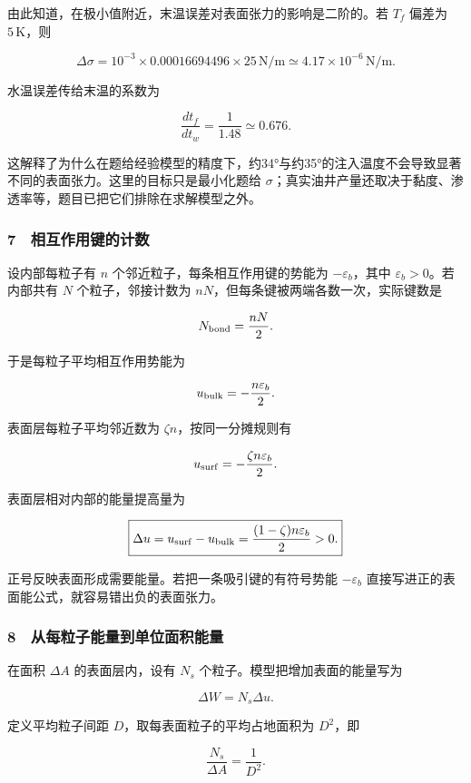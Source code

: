\documentclass[12pt,a4paper,fontset=fandol]{ctexart}
\begin{document}
由此知道，在极小值附近，末温误差对表面张力的影响是二阶的。若 \(T_f\)
偏差为 \(5\,\mathrm K\)，则

\[\Delta\sigma
=10^{-3}\times0.00016694496\times25\,\mathrm{N/m}
\simeq4.17\times10^{-6}\,\mathrm{N/m}.\]

水温误差传给末温的系数为

\[\frac{dt_f}{dt_w}=\frac1{1.48}\simeq0.676.\]

这解释了为什么在题给经验模型的精度下，约34°与约35°的注入温度不会导致显著不同的表面张力。这里的目标只是最小化题给
\(\sigma\)；真实油井产量还取决于黏度、渗透率等，题目已把它们排除在求解模型之外。

\subsubsection{7　相互作用键的计数}\label{ux76f8ux4e92ux4f5cux7528ux952eux7684ux8ba1ux6570}

设内部每粒子有 \(n\) 个邻近粒子，每条相互作用键的势能为
\(-\varepsilon_b\)，其中 \(\varepsilon_b>0\)。若内部共有 \(N\)
个粒子，邻接计数为 \(nN\)，但每条键被两端各数一次，实际键数是

\[N_{\rm bond}=\frac{nN}{2}.\]

于是每粒子平均相互作用势能为

\[u_{\rm bulk}=-\frac{n\varepsilon_b}{2}.\]

表面层每粒子平均邻近数为 \(\zeta n\)，按同一分摊规则有

\[u_{\rm surf}=-\frac{\zeta n\varepsilon_b}{2}.\]

表面层相对内部的能量提高量为

\[\boxed{\Delta u=u_{\rm surf}-u_{\rm bulk}
=\frac{(1-\zeta)n\varepsilon_b}{2}>0.}\]

正号反映表面形成需要能量。若把一条吸引键的有符号势能 \(-\varepsilon_b\)
直接写进正的表面能公式，就容易错出负的表面张力。

\subsubsection{8　从每粒子能量到单位面积能量}\label{ux4eceux6bcfux7c92ux5b50ux80fdux91cfux5230ux5355ux4f4dux9762ux79efux80fdux91cf}

在面积 \(\Delta A\) 的表面层内，设有 \(N_s\)
个粒子。模型把增加表面的能量写为

\[\Delta W=N_s\Delta u.\]

定义平均粒子间距 \(D\)，取每表面粒子的平均占地面积为 \(D^2\)，即

\[\frac{N_s}{\Delta A}=\frac1{D^2}.\]
\end{document}
